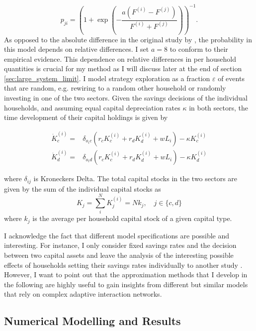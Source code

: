 \begin{equation}
	p_{ji} =  \left(1 + \exp \left(- \frac{a(F^{(i)} - F^{(j)})}{F^{(i)} + F^{(j)}} \right) \right)^{-1}.
    \label{eq:approx_ip}
\end{equation}
As opposed to the absolute difference in the original study by \cite{Traulsen2010}, the probability in this model depends on relative differences. 
I set $a = 8$ to conform to their empirical evidence. This dependence on relative differences in per household quantities is crucial for my method as I will discuss later at the end of section \ref{sec:large_system_limit}.
I model strategy exploration as a fraction $\varepsilon$ of events that are random, e.g. rewiring to a random other household or randomly investing in one of the two sectors.
Given the savings decisions of the individual households, and assuming equal capital depreciation rates $\kappa$ in both sectors, the time development of their capital holdings is given by

\begin{align}
	\dot{K}_c^{(i)} =& \delta_{o_ic} \left( r_c K_c^{(i)} + r_d K_d^{(i)} + w L_i \right) - \kappa K_c^{(i)} \label{eq:approx_ci}\\
	\dot{K}_d^{(i)} =& \delta_{o_id} \left( r_c K_c^{(i)} + r_d K_d^{(i)} + w L_i \right) - \kappa K_d^{(i)} \label{eq:approx_di}
\end{align}

where $\delta_{ij}$ is Kroneckers Delta. The total capital stocks in the two sectors are given by the sum of the individual capital stocks as
\begin{equation}
  K_j = \sum_i^N K_j^{(i)} = N k_j, \quad j \in \{c, d\}
\end{equation}
where $k_j$ is the average per household capital stock of a given capital type.

I acknowledge the fact that different model specifications are possible and interesting.
For instance, I only consider fixed savings rates and the decision between two capital assets and leave the analysis of the interesting possible effects of households setting their savings rates individually to another study \citep{Asano2019}.
However, I want to point out that the approximation methods that I develop in the following are highly useful to gain insights from different but similar models that rely on complex adaptive interaction networks.


   
\subsection{Numerical Modelling and Results} 
\label{sec:numerical_results}

